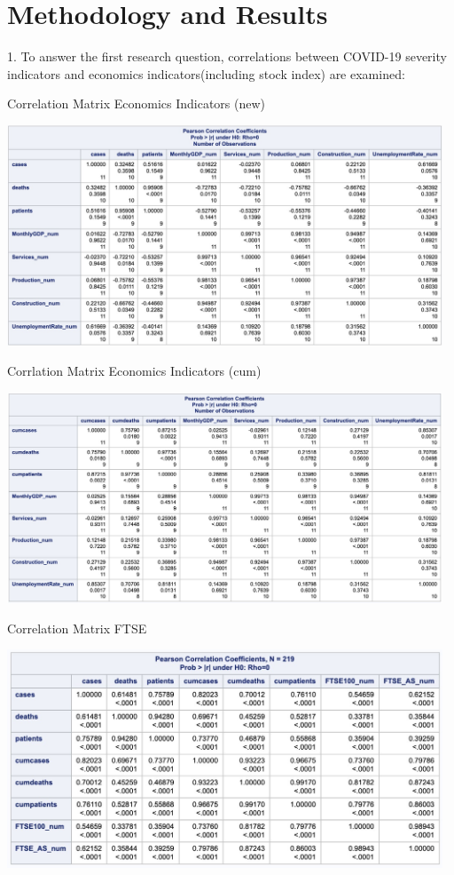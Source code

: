 \documentclass[12pt, a4paper]{report}
\begin{document}
\section{Methodology and Results}
1. To answer the first research question, correlations between COVID-19 severity indicators
and economics indicators(including stock index) are examined:

\begin{table}[H]
\centering
\caption{Correlation Matrix Economics Indicators (new)}
\includegraphics[width=13cm]{corr_economics_new.jpg}
\end{table}

\begin{table}[H]
\centering
\caption{Corrlation Matrix Economics Indicators (cum)}
\includegraphics[width=13cm]{corr_economics_cum.jpg}
\end{table}

\begin{table}[H]
\centering
\caption{Correlation Matrix FTSE}
\includegraphics[width=13cm]{corr_stock.jpg}
\end{table}
\hspace*{\fill}
\end{document}
